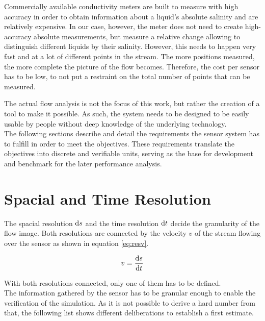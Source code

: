 Commercially available conductivity meters are built to measure with high accuracy in order to obtain information about a liquid's absolute salinity and are relatively expensive. In our case, however, the meter does not need to create high-accuracy absolute measurements, but measure a relative change allowing to distinguish different liquids by their salinity. However, this needs to happen very fast and at a lot of different points in the stream. The more positions measured, the more complete the picture of the flow becomes. Therefore, the cost per sensor has to be low, to not put a restraint on the total number of points that can be measured.

The actual flow analysis is not the focus of this work, but rather the creation of a tool to make it possible. As such, the system needs to be designed to be easily usable by people without deep knowledge of the underlying technology.\\

The following sections describe and detail the requirements the sensor system has to fulfill in order to meet the objectives. These requirements translate the objectives into discrete and verifiable units, serving as the base for development and benchmark for the later performance analysis. 

\section{Spacial and Time Resolution}

The spacial resolution $ \mathop{}\!\mathrm{d} s $ and the time resolution $ \mathop{}\!\mathrm{d} t $ decide the granularity of the flow image. Both resolutions are connected by the velocity $ v $ of the stream flowing over the sensor as shown in equation \eqref{eq:resv}.

\begin{equation}
	v = \dfrac{\mathop{}\!\mathrm{d} s}{\mathop{}\!\mathrm{d} t}
\label{eq:resv} 
\end{equation}

With both resolutions connected, only one of them has to be defined. \\

The information gathered by the sensor has to be granular enough to enable the verification of the simulation. As it is not possible to derive a hard number from that, the following list shows different deliberations to establish a first estimate. \\

